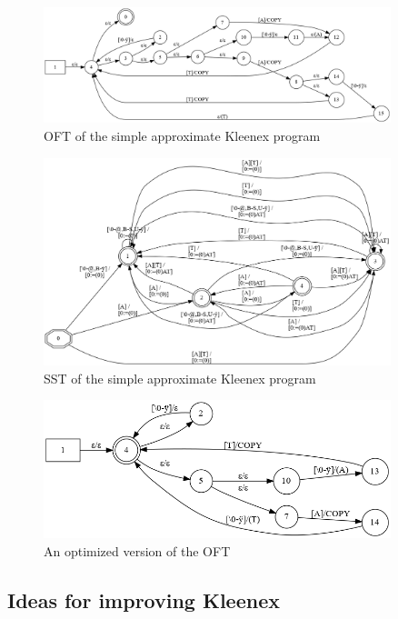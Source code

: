 \begin{figure}[!hb]
  \centering
  \includegraphics[width=0.9\textwidth]{images/oft.png}
  \caption{OFT of the simple approximate Kleenex program}
  \label{fig:oft}
\end{figure}
\begin{figure}[!hb]
  \centering
  \includegraphics[width=0.9\textwidth]{images/sst.png}
  \caption{SST of the simple approximate Kleenex program}
  \label{fig:sst}
\end{figure}

\begin{figure}[!hb]
  \centering
  \includegraphics[width=0.9\textwidth]{images/opt.png}
  \caption{An optimized version of the OFT}
  \label{fig:opt}
\end{figure}

\subsection{Ideas for improving Kleenex}

